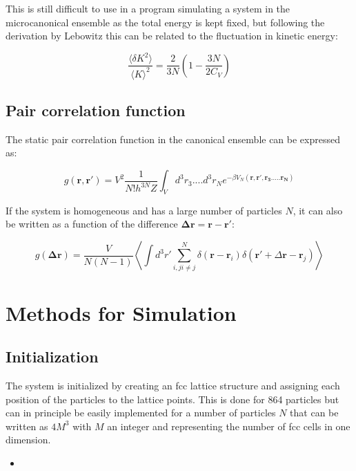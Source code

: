 \documentclass[
10pt, %
a4paper, %
oneside, %
headinclude,footinclude, %
BCOR5mm, %
]{scrartcl}
\newcommand{\insertcode}[2]{\begin{itemize}\item[]\end{itemize}} %
\begin{document}
\noindent
This is still difficult to use in a program simulating a system in the microcanonical ensemble as the total energy is kept fixed, but following the derivation by Lebowitz\cite{Duane:1985lz} this can be related to the fluctuation in kinetic energy:

$$ \frac{\langle\delta K^2\rangle}{\langle K\rangle^2} = \frac{2}{3N} \left ( 1 - \frac{3N}{2C_V} \right ) $$



\subsection{Pair correlation function}

The static pair correlation function in the canonical ensemble can be expressed as:

$$ g(\mathbf{r,r'}) = V^2 \frac{1}{N!h^{3N}Z} \int_V d^3r_3....d^3r_N e^{-\beta V_N(\mathbf{r,r',r_3.....r_N})} $$

\noindent
If the system is homogeneous and has a large number of particles $N$, it can also be written as a function of the difference $\mathbf{\Delta r} = \mathbf{r} - \mathbf{r'}$:

$$ g(\mathbf{\Delta r}) = \frac{V}{N(N-1)}  \left \langle \int d^3r' \sum_{i,j i \neq j}^N \delta(\mathbf{r}-\mathbf{r}_i) \delta(\mathbf{r'} + \Delta\mathbf{r} - \mathbf{r}_j) \right \rangle $$

\newpage

\section{Methods for Simulation}

\subsection{Initialization}

The system is initialized by creating an fcc lattice structure and assigning each position of the particles to the lattice points. This is done for 864 particles but can in principle be easily implemented for a number of particles $N$ that can be written as $4M^3$ with $M$ an integer and representing the number of fcc cells in one dimension.

\insertcode{"Scripts/initialization_snippet_1.f90"}{Constructing the fcc lattice} %
\end{document}
